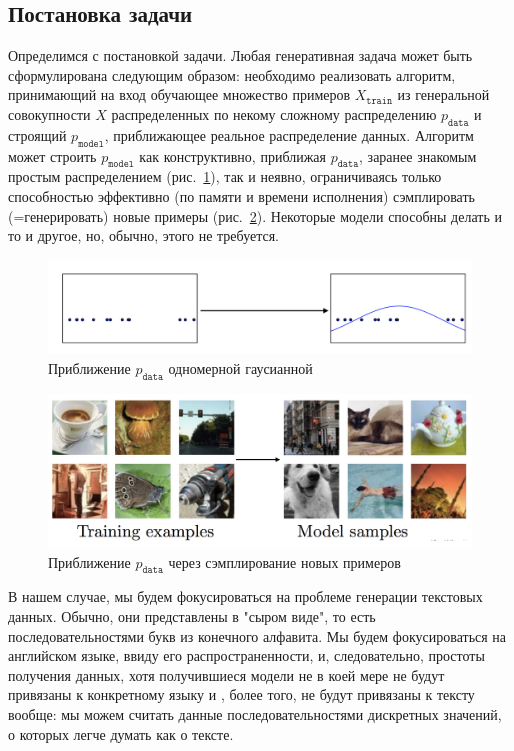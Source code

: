 \documentclass{spbau-diploma}
\begin{document}
\subsection{Постановка задачи}
\newcommand{\Xtrain}{X_{\texttt{train}}}
\newcommand{\pdata}{p_{\texttt{data}}}
\newcommand{\pmodel}{p_{\texttt{model}}}
Определимся с постановкой задачи. Любая генеративная задача может быть 
сформулирована следующим образом: необходимо реализовать алгоритм, принимающий 
на вход обучающее множество примеров $\Xtrain$ из генеральной совокупности $X$ 
распределенных по некому сложному распределению $\pdata$ и строящий $\pmodel$, 
приближающее реальное распределение данных. Алгоритм может строить $\pmodel$ как 
конструктивно, приближая $\pdata$, заранее знакомым простым распределением 
(рис.~\ref{density_estimation}), так и неявно, ограничиваясь 
только способностью эффективно (по памяти и времени исполнения) сэмплировать 
(=генерировать) новые примеры (рис.~\ref{density_samples}). Некоторые модели 
способны делать и то и другое, но, обычно, этого не требуется.

\begin{figure}[h]
\centering
\includegraphics[width=\textwidth]{images/density_estimation.png}
\caption{Приближение $\pdata$ одномерной гаусианной}
\label{density_estimation}
\end{figure}

\begin{figure}[h]
\centering
\includegraphics[width=\textwidth]{images/density_samples.png}
\caption{Приближение $\pdata$ через сэмплирование новых примеров}
\label{density_samples}
\end{figure}

В нашем случае, мы будем фокусироваться на проблеме генерации текстовых данных.
Обычно, они представлены в "сыром виде", то есть последовательностями
букв из конечного алфавита. Мы будем фокусироваться на английском языке, 
ввиду его распространенности, и, следовательно, простоты получения данных, хотя 
получившиеся модели не в коей мере не будут привязаны к конкретному языку и 
, более того, не будут привязаны к тексту вообще: мы можем считать данные 
последовательностями дискретных значений, о которых легче думать как о тексте.
\end{document}
